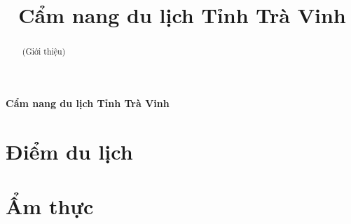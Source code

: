 \documentclass{article}
\title{Cẩm nang du lịch Tỉnh Trà Vinh}
\begin{document}
\begin{center}
    \fontsize{18}{20}\textbf{Cẩm nang du lịch Tỉnh Trà Vinh}
\end{center}
\begin{abstract}
    (Giới thiệu)
\end{abstract}
\section*{Điểm du lịch}
\newpage
\section*{{Ẩm thực}}
\end{document}
